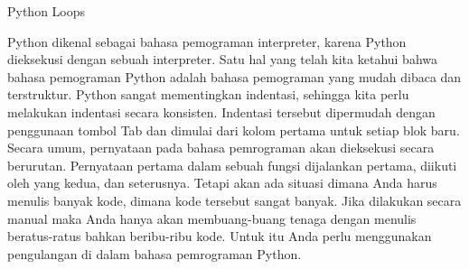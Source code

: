 \sloppy
\begin{center}Python Loops\end{center} \par
\vspace{12pt}
\vspace{12pt}
Python dikenal sebagai bahasa pemograman interpreter, karena Python dieksekusi dengan sebuah interpreter. Satu hal yang telah kita ketahui bahwa bahasa pemograman Python adalah bahasa pemograman yang mudah dibaca dan terstruktur. Python sangat mementingkan indentasi, sehingga kita perlu melakukan indentasi secara konsisten. Indentasi tersebut dipermudah dengan penggunaan tombol Tab dan dimulai dari kolom pertama untuk setiap blok baru\cite{santoso2009bahasa}.
Secara umum, pernyataan pada bahasa pemrograman akan dieksekusi secara berurutan. Pernyataan pertama dalam sebuah fungsi dijalankan pertama, diikuti oleh yang kedua, dan seterusnya. Tetapi akan ada situasi dimana Anda harus menulis banyak kode, dimana kode tersebut sangat banyak. Jika dilakukan secara manual maka Anda hanya akan membuang-buang tenaga dengan menulis beratus-ratus bahkan beribu-ribu kode. Untuk itu Anda perlu menggunakan pengulangan di dalam bahasa pemrograman Python. \par

